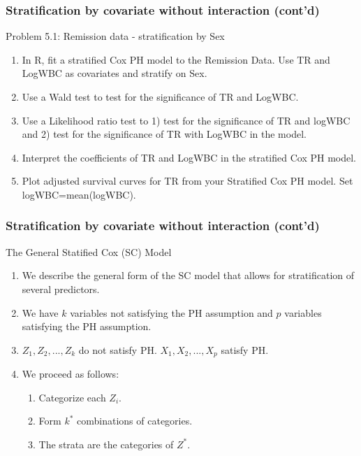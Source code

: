 \documentclass{beamer}
\theoremstyle{definition}
\begin{document}
\begin{frame}
\frametitle{Stratification by covariate without interaction (cont'd)}
\begin{block}{Problem 5.1: Remission data - stratification by Sex}
\begin{enumerate}
\item In R, fit a stratified Cox PH model to the Remission Data. Use TR and LogWBC as covariates and stratify on Sex.
\item Use a Wald test to test for the significance of TR and LogWBC.
\item Use a Likelihood ratio test to 1) test for the significance of TR and logWBC and 2) test for the significance of TR with LogWBC in the model.
\item Interpret the coefficients of TR and LogWBC in the stratified Cox PH model.
\item Plot adjusted survival curves for TR from your Stratified Cox PH model. Set logWBC=mean(logWBC).
\end{enumerate}
\end{block}
\end{frame}

\begin{frame}
\frametitle{Stratification by covariate without interaction (cont'd)}
\begin{block}{The General Statified Cox (SC) Model}
\begin{enumerate}
\item We describe the general form of the SC model that allows for stratification of several predictors.
\item We have $k$ variables not satisfying the PH assumption and $p$ variables satisfying the PH assumption.
\item $Z_1, Z_2,. . ., Z_k$ do not satisfy PH. $X_1, X_2,. . ., X_p$ satisfy PH.
\item We proceed as follows:
\begin{enumerate}
\item Categorize each $Z_i$.
\item Form $k^*$ combinations of categories.
\item The strata are the categories of $Z^*$.
\end{enumerate}
\end{enumerate}
\end{block}
\end{frame}
\end{document}
